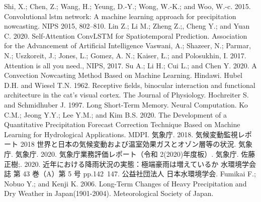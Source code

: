 \begin{thebibliography}{99}
 Shi, X.; Chen, Z.; Wang, H.; Yeung, D.-Y.; Wong, W.-K.; and Woo, W.-c. 2015. Convolutional lstm network: A machine learning approach for precipitation nowcasting. NIPS 2015, 802–810.
 Lin Z.; Li M.; Zheng Z.;, Cheng Y.; and Yuan C. 2020. Self-Attention ConvLSTM for Spatiotemporal Prediction. Association for the Advancement of Artificial Intelligence
 Vaswani, A.; Shazeer, N.; Parmar, N.; Uszkoreit, J.; Jones, L.; Gomez, A. N.; Kaiser, Ł.; and Polosukhin, I. 2017. Attention is all you need., NIPS, 2017.
 Su A.; Li H.; Cui L.; and Chen Y. 2020. A Convection Nowcasting Method Based on Machine Learning. Hindawi.
 Hubel D.H. and Wiesel T.N. 1962. Receptive fields, binocular interaction and functional architecture in the cat's visual cortex. The Journal of Physiology.
 Hochreiter S. and Schmidhuber J. 1997. Long Short-Term Memory. Neural Computation.
 Ko C.M.; Jeong Y.Y.; Lee Y.M.; and Kim B.S. 2020. The Development of a Quantitative Precipitation Forecast Correction Technique Based on Machine Learning for Hydrological Applications. MDPI.
 気象庁. 2018. 気候変動監視レポート 2018 世界と日本の気候変動および温室効果ガスとオゾン層等の状況. 気象庁.
 気象庁. 2020. 気象庁業務評価レポート（令和 2(2020)年度板）. 気象庁.
 佐藤正樹;. 2020. 近年における降雨状況の実態：極端豪雨は増えているか 水環境学会誌 第 43 巻（A）第 5 号 pp.142~147. 公益社団法人 日本水環境学会.
 Fumikai F.; Nobuo Y.; and Kenji K. 2006. Long-Term Changes of Heavy Precipitation and Dry Weather in Japan(1901-2004). Meteorological Society of Japan.
\end{thebibliography}
